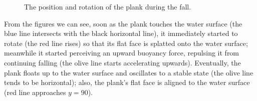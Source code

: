 \begin{figure}[h]
	\centering
	\caption{The position and rotation of the plank during the fall.}
	\label{simulation-result}
\end{figure}

From the figures we can see, soon as the plank touches the water surface (the blue line intersects with the black horizontal line), it immediately started to rotate (the red line rises) so that its flat face is splatted onto the water surface;
meanwhile it started perceiving an upward buoyancy force, repulsing it from continuing falling (the olive line starts accelerating upwards).
Eventually, the plank floats up to the water surface and oscillates to a stable state (the olive line tends to be horizontal);
also, the plank's flat face is aligned to the water surface (red line approaches $y=90$).

